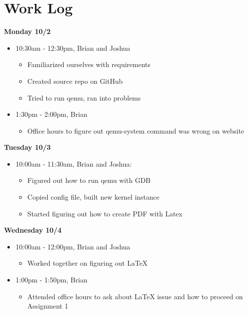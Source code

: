 \documentclass[letterpaper, onecolumn, draftclsnofoot, 10pt, compsoc]{IEEEtran}
\begin{document}
\section{Work Log}
    \textbf{Monday 10/2}
        \begin{itemize}
            \item 10:30am - 12:30pm, Brian and Joshua
            \begin{itemize}
                \item Familiarized ourselves with requirements
                \item Created source repo on GitHub
                \item Tried to run qemu, ran into problems
            \end{itemize}
            \item 1:30pm - 2:00pm, Brian
                \begin{itemize}
                    \item Office hours to figure out qemu-system command was wrong on website
                \end{itemize}
        \end{itemize}
    \textbf{Tuesday 10/3}
        \begin{itemize}
            \item 10:00am - 11:30am, Brian and Joshua:
            \begin{itemize}
                \item Figured out how to run qemu with GDB
                \item Copied config file, built new kernel instance
                \item Started figuring out how to create PDF with Latex
            \end{itemize}
        \end{itemize}
    \textbf{Wednesday 10/4}
        \begin{itemize}
            \item 10:00am - 12:00pm, Brian and Joshua
            \begin{itemize}
                \item Worked together on figuring out LaTeX
            \end{itemize}
            \item 1:00pm - 1:50pm, Brian
                \begin{itemize}
                    \item Attended office hours to ask about LaTeX issue and how to proceed on Assignment 1
                \end{itemize}
        \end{itemize}
\end{document}
